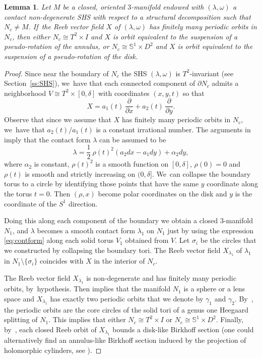 \documentclass[10pt]{amsart}
\newcommand{\threemanifold}{$3$\nobreakdash-mani\-fold\xspace}
\newtheorem{lemma}[theorem]{Lemma}
\theoremstyle{definition}
\newcommand{\pp}[2]{\frac{\partial#1}{\partial#2}}
\newcommand{\mS}{\mathbb{S}}
\begin{document}
\begin{lemma}\label{lem:reebpseudo}
Let $M$ be a closed, oriented \threemanifold endowed with $(\lambda,\omega)$ a contact non-degenerate SHS with respect to a structural decomposition such that $N_c\neq M$. If~the Reeb vector field $X$ of $(\lambda, \omega)$ has finitely many periodic orbits in $N_c$, then either $N_c\cong T^2\times I$ and $X$ is orbit equivalent to the suspension of a pseudo-rotation of the annulus, or $N_c\cong \mS^1\times D^2$ and $X$ is orbit equivalent to the suspension of a pseudo-rotation of the disk.
\end{lemma}

\begin{proof}
Since near the boundary of $N_c$ the SHS $(\lambda, \omega)$ is $T^2$-invariant (see Section~\ref{ss:SHS}), we~have that each connected component of $\partial N_c$ admits a neighborhood $V\cong T^2\times [0,\delta]$ with coordinates $(x,y,t)$ so that
\begin{equation}\label{eq:reebinv}
X=a_1(t)\,\pp{}{x} + a_2(t)\, \pp{}{y}.
\end{equation}
{Observe that since we assume that $X$ has finitely many periodic orbits in $N_c$, we~have that $a_2(t)/a_1(t)$ is a constant irrational number. The arguments in \cite[\S 5.2]{HT} imply that the contact form $\lambda$} can be assumed to be
\begin{equation}\label{eq:contform}
\lambda= \frac{1}{2}\ \rho(t)^2 (a_2dx-a_1dy) + \alpha_2 dy,
\end{equation}
where $\alpha_2$ is constant, $\rho(t)^2$ is a smooth function on $[0,\delta]$, $\rho(0)=0$ and $\rho(t)$ is smooth and strictly increasing on $(0,\delta]$. We~can collapse the boundary torus to a circle by identifying those points that have the same $y$ coordinate along the torus $t=0$. Then $(\rho,x)$ become polar coordinates on the disk and $y$ is the coordinate of the $S^1$ direction.

Doing this along each component of the boundary we obtain a closed \threemanifold~$N_1$, and $\lambda$ becomes a smooth contact form $\lambda_1$ on $N_1$ just by using the expression \eqref{eq:contform} along each solid torus $V_1$ obtained from $V$. Let $\sigma_i$ be the circles that we constructed by collapsing the boundary tori. The Reeb vector field $X_{\lambda_1}$ of $\lambda_1$ in $N_1\setminus \{\sigma_i\}$ coincides with $X$ in the interior of $N_c$.

The Reeb vector field $X_{\lambda_1}$ is non-degenerate and has finitely many periodic orbits, by~hypothesis. Then \cite[Th.\,1.2]{CDR} implies that the manifold $N_1$ is a sphere or a lens space and $X_{\lambda_1}$ has exactly two periodic orbits that we denote by $\gamma_1$ and $\gamma_2$. By~\cite[Th.\,1.2]{HT}, the periodic orbits are the core circles of the solid tori of a genus one Heegaard splitting of $N_1$. This implies that either $N_c\cong T^2\times I$ or $N_c \cong \mS^1 \times D^2$. Finally, by~\cite[Cor.\,1.10]{CGHHL}, each closed Reeb orbit of $X_{\lambda_1}$ bounds a disk-like Birkhoff section (one could alternatively find an annulus-like Birkhoff section induced by the projection of holomorphic cylinders, see \cite[\S 4.6]{HT}).


\end{proof}
\end{document}
